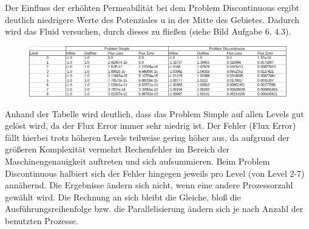 \documentclass[12pt,a4paper]{scrartcl}
\numberwithin{equation}{section}
\begin{document}
\begin{enumerate}[label=(\roman*)]
%
Der Einfluss der erhöhten Permeabilität bei dem Problem Discontinuous ergibt deutlich niedrigere Werte des Potenziales u in der Mitte des Gebietes. Dadurch wird das Fluid versuchen, durch dieses zu fließen (siehe Bild Aufgabe 6, 4.3).
\begin{figure}[H]
	\centering
	\captionabove{}
	\includegraphics[width=\textwidth]{../../Abb5/data.png}
\end{figure}
Anhand der Tabelle wird deutlich, dass das Problem Simple auf allen Levels gut gelöst wird, da der Flux Error immer sehr niedrig ist. Der Fehler (Flux Error) fällt hierbei trotz höheren Levels teilweise gering höher aus, da aufgrund der größeren Komplexität vermehrt Rechenfehler im Bereich der Maschinengenauigkeit auftreten und sich aufsummieren. 
\newline Beim Problem Discontinuous halbiert sich der Fehler hingegen jeweils pro Level (von Level 2-7)
 annähernd.
Die Ergebnisse ändern sich nicht, wenn eine andere Prozessorzahl gewählt wird. Die Rechnung an sich bleibt die Gleiche, bloß die Ausführungsreihenfolge bzw. die Parallelisierung ändern sich je nach Anzahl der benutzten Prozesse. 
\end{enumerate}
\end{document}
